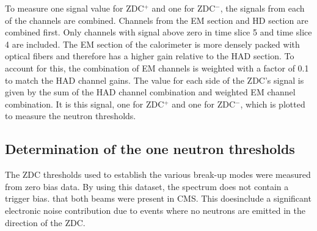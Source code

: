      To measure one signal value for ZDC$^{+}$ and one for ZDC$^{-}$, the 
        signals from each of the channels are combined.
      Channels from the EM section and HD section are combined first. 
      Only channels with signal above zero in time slice 5 and time slice 
        4 are included. 
      The EM section of the calorimeter is more densely packed with optical 
        fibers and therefore has a higher gain relative to the HAD section. 
      To account for this, the combination of EM channels is weighted with
        a factor of 0.1 to match the HAD channel gains.
      The value for each side of the ZDC's signal is given by the sum of the 
        HAD channel combination and weighted EM channel combination.
      It is this signal, one for ZDC$^{+}$ and one for ZDC$^{-}$, 
        which is plotted \DIFaddbegin {}\DIFaddend to measure the neutron 
        thresholds.

    \subsection{Determination of the one neutron thresholds}
      The ZDC thresholds used to establish the various break-up modes were 
        measured from zero bias data.
      By using this dataset, the \DIFaddbegin {}\DIFaddend spectrum does not contain a trigger 
        bias. 
      \DIFdelbegin {}\DIFdelend \DIFaddbegin {}\DIFaddend that both beams were present in CMS.
      This does\DIFdelbegin {}\DIFdelend \DIFaddbegin {}\DIFaddend include a significant electronic noise contribution due
        to events where no neutrons are emitted in the direction of the ZDC.


